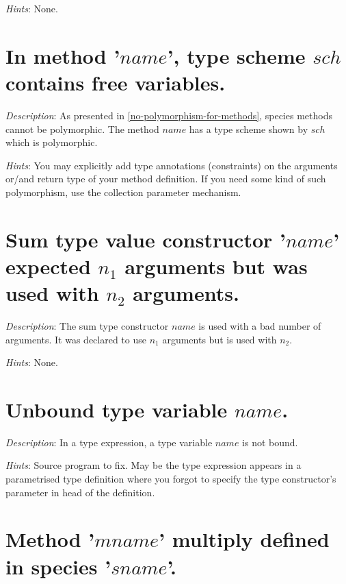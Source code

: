 {\em Hints}: None.



\section*{In method '$name$', type scheme $sch$ contains free variables.}

{\em Description}: As presented in \ref{no-polymorphism-for-methods},
species methods cannot be polymorphic. The method $name$ has a
 type scheme shown by $sch$  which is polymorphic.

{\em Hints}:  You may explicitly add type
annotations (constraints) on the arguments or/and return type of your
method definition. If you need some kind of such polymorphism, use the
collection parameter mechanism.




\section*{Sum type  value constructor '$name$' expected $n_1$ arguments but
  was used with $n_2$ arguments.}

{\em Description}: The sum type constructor $name$ is used with a bad
number of arguments. It was declared to use $n_1$ arguments but is
used with $n_2$.

{\em Hints}: None.



\section*{Unbound type variable $name$.}

{\em Description}: In a type expression, a type variable $name$ is not
bound.

{\em Hints}: Source program to fix. May be the type expression appears
in a parametrised type definition where you forgot to specify the type
constructor's parameter in head of the definition.



\section*{Method '$mname$' multiply defined in species '$sname$'.}


